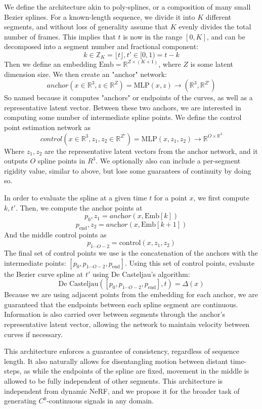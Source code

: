 We define the architecture akin to poly-splines, or a composition of many small Bezier splines.
For a known-length sequence, we divide it into $K$ different segments, and without loss of
generality assume that $K$ evenly divides the total number of frames. This implies that $t$ is
now in the range $[0, K]$, and can be decomposed into a segment number and fractional component:
\[ k\in\mathbb{Z}_K=\lfloor t\rfloor, t'\in[0,1)=t-k \]
Then we define an embedding $\text{Emb} = \mathbb{R}^{Z\times(K+1)}$, where $Z$ is some latent
dimension size. We then create an "anchor" network:
\[
    \textit{anchor}(x\in\mathbb{R}^3,z\in\mathbb{R}^Z) = \text{MLP}(x,z)\to(\mathbb{R}^3,\mathbb{R}^{Z'})
\]
So named because it computes "anchors"
or endpoints of the curves, as well as a representative latent vector. Between these two
anchors, we are interested in computing some number of intermediate spline points. We define the
control point estimation network as
\[
\textit{control}(x\in\mathbb{R}^3, z_1, z_2\in\mathbb{R}^{Z'}) = \text{MLP}(x,z_1,z_2)\to\mathbb{R}^{O\times\mathbb{R}^3}
\]
Where $z_1,z_2$ are the
representative latent vectors from the anchor network, and it outputs $O$ spline points in
$R^3$. We optionally also can include a per-segment rigidity value, similar to above, but lose
some guarantees of continuity by doing so.

In order to evaluate the spline at a given time $t$ for a point $x$, we first compute $k, t'$. Then, we compute
the anchor points at
\[ p_0,z_1=\textit{anchor}(x,\text{Emb}[k]) \]
\[ p_\text{end},z_2=\textit{anchor}(x,\text{Emb}[k+1]) \]
And the middle control points as \[ p_{1\cdots O-2} = \text{control}(x,z_1,z_2) \]
The final set of control points we use
is the concatenation of the anchors with the intermediate points:
$[p_0, p_{1\cdots O-2}, p_\text{end}]$. Using this set of control points, evaluate the Bezier
curve spline at $t'$ using De Casteljau's algorithm:
\[ \text{De Casteljau}([p_0, p_{1\cdots O-2}, p_\text{end}], t) = \Delta(x) \]
Because we are using adjacent points from
the embedding for each anchor, we are guaranteed that the endpoints between each spline segment
are continuous. Information is also carried over between segments through the anchor's
representative latent vector, allowing the network to maintain velocity between curves if necessary.

This architecture enforces a guarantee of consistency, regardless of sequence length. It also
naturally allows for disentangling motion between distant time-steps, as while the endpoints of
the spline are fixed, movement in the middle is allowed to be fully independent of other
segments. This architecture is independent from dynamic NeRF, and we propose it for the broader task of generating $C^0$-continuous signals in any domain.

